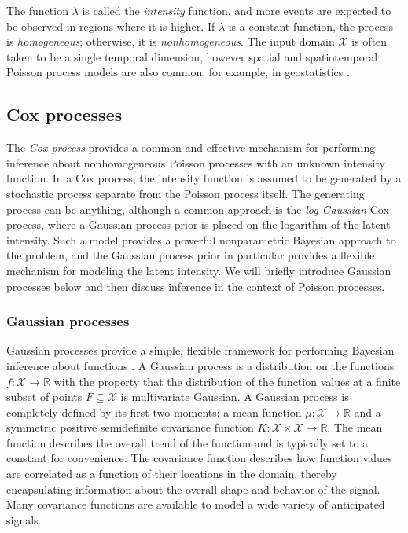 \documentclass{article}
\newcommand{\cm}[1]{\mathcal{#1}}
\newcommand{\R}{\mathbb{R}}
\begin{document}
The function $\lambda$ is called the \emph{intensity} function, and
more events are expected to be observed in regions where it is higher.
If $\lambda$ is a constant function, the process is
\emph{homogeneous}; otherwise, it is \emph{nonhomogeneous}.  The input
domain $\cm{X}$ is often taken to be a single temporal dimension,
however spatial and spatiotemporal Poisson process models are also
common, for example, in geostatistics \citep{diggle}.

\subsection{Cox processes}

The \emph{Cox process} provides a common and effective mechanism for
performing inference about nonhomogeneous Poisson processes with an
unknown intensity function.  In a Cox process, the intensity function
is assumed to be generated by a stochastic process separate from the
Poisson process itself.  The generating process can be anything,
although a common approach is the \emph{log-Gaussian} Cox process,
where a Gaussian process prior is placed on the logarithm of the
latent intensity.  Such a model provides a powerful nonparametric
Bayesian approach to the problem, and the Gaussian process prior in
particular provides a flexible mechanism for modeling the latent
intensity.  We will briefly introduce Gaussian processes below and
then discuss inference in the context of Poisson processes.

\subsubsection{Gaussian processes}

Gaussian processes provide a simple, flexible framework for performing
Bayesian inference about functions \citep{gpml}.  A Gaussian process
is a distribution on the functions $f\colon \cm{X} \to \R$ with the
property that the distribution of the function values at a finite
subset of points $F \subseteq \cm{X}$ is multivariate Gaussian.  A
Gaussian process is completely defined by its first two moments: a
mean function $\mu\colon \cm{X} \to \R$ and a symmetric positive
semidefinite covariance function $K\colon \cm{X} \times \cm{X} \to
\R$.  The mean function describes the overall trend of the function
and is typically set to a constant for convenience.  The covariance
function describes how function values are correlated as a function of
their locations in the domain, thereby encapsulating information about
the overall shape and behavior of the signal.  Many covariance
functions are available to model a wide variety of anticipated
signals.
\end{document}
